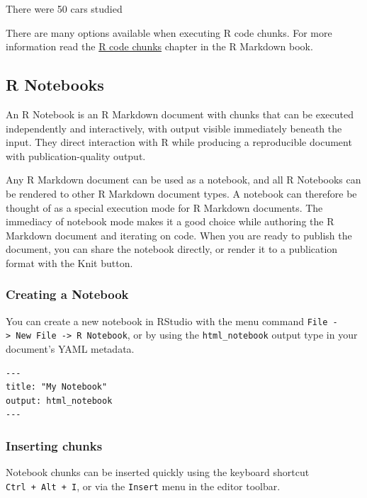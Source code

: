 \documentclass[]{book}
\begin{document}
There were 50 cars studied

There are many options available when executing R code chunks. For more information read the
\href{https://bookdown.org/yihui/rmarkdown/r-code.html}{R code chunks} chapter in the R Markdown book.

\hypertarget{r-notebooks}{%
\subsection{R Notebooks}\label{r-notebooks}}

An R Notebook is an R Markdown document with chunks that can be executed independently and
interactively, with output visible immediately beneath the input. They direct interaction with
R while producing a reproducible document with publication-quality output.

Any R Markdown document can be used as a notebook, and all R Notebooks can be rendered to other R
Markdown document types. A notebook can therefore be thought of as a special execution mode for R
Markdown documents. The immediacy of notebook mode makes it a good choice while authoring the R
Markdown document and iterating on code. When you are ready to publish the document, you can share
the notebook directly, or render it to a publication format with the Knit button.

\hypertarget{creating-a-notebook}{%
\subsubsection{Creating a Notebook}\label{creating-a-notebook}}

You can create a new notebook in RStudio with the menu command \texttt{File\ -\textgreater{}\ New\ File\ -\textgreater{}\ R\ Notebook},
or by using the \texttt{html\_notebook} output type in your document's YAML metadata.

\begin{verbatim}
---
title: "My Notebook"
output: html_notebook
---
\end{verbatim}

\hypertarget{inserting-chunks}{%
\subsubsection{Inserting chunks}\label{inserting-chunks}}

Notebook chunks can be inserted quickly using the keyboard shortcut \texttt{Ctrl\ +\ Alt\ +\ I}, or via the
\texttt{Insert} menu in the editor toolbar.
\end{document}
